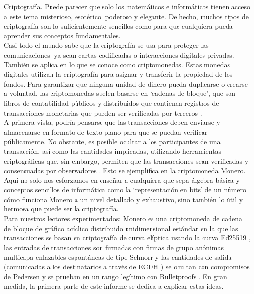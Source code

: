 

Criptografía. Puede parecer que solo los matemáticos e informáticos tienen acceso a este tema misterioso, esotérico, poderoso y elegante. De hecho, muchos tipos de criptografía son lo suficientemente sencillos como para que cualquiera pueda aprender sus conceptos fundamentales.
\\ \newline
Casi todo el mundo sabe que la criptografía se usa para proteger las comunicaciones, ya sean cartas codificadas o interacciones digitales privadas. También se aplica en lo que se conoce como criptomonedas. Estas monedas digitales utilizan la criptografía para asignar y transferir la propiedad de los fondos. Para garantizar que ninguna unidad de dinero pueda duplicarse o crearse a voluntad, las criptomonedas suelen basarse en `cadenas de bloque', que son libros de contabilidad públicos y distribuidos que contienen registros de transacciones monetarias que pueden ser verificadas por terceros \cite{Nakamoto_bitcoin}.
\\ \newline
A primera vista, podría pensarse que las transacciones deben enviarse y almacenarse en formato de texto plano para que se puedan verificar públicamente. No obstante, es posible ocultar a los participantes de una transacción, así como las cantidades implicadas, utilizando herramientas criptográficas que, sin embargo, permiten que las transacciones sean verificadas y consensuadas por observadores \cite{cryptoNoteWhitePaper}. Esto se ejemplifica en la criptomoneda Monero.
\\ \newline
Aquí no solo nos esforzamos en enseñar a cualquiera que sepa álgebra básica y conceptos sencillos de informática como la `representación en bits' de un número cómo funciona Monero a un nivel detallado y exhaustivo, sino también lo útil y hermosa que puede ser la criptografía.
\\ \newline
Para nuestros lectores experimentados: Monero es una criptomoneda de cadena de bloque de gráfico acíclico distribuido unidimensional estándar \cite{Nakamoto_bitcoin} en la que las transacciones se basan en criptografía de curva elíptica usando la curva Ed25519 \cite{Bernstein2008}, las entradas de transacciones son firmadas con firmas de grupo anónimas multicapa enlazables espontáneas de tipo Schnorr \cite{MRL-0005-ringct} y las cantidades de salida (comunicadas a los destinatarios a través de ECDH \cite{Diffie-Hellman}) se ocultan con compromisos de Pedersen \cite{maxwell-ct} y se prueban en un rango legítimo con Bulletproofs \cite{Bulletproofs_paper}. En gran medida, la primera parte de este informe se dedica a explicar estas ideas.
